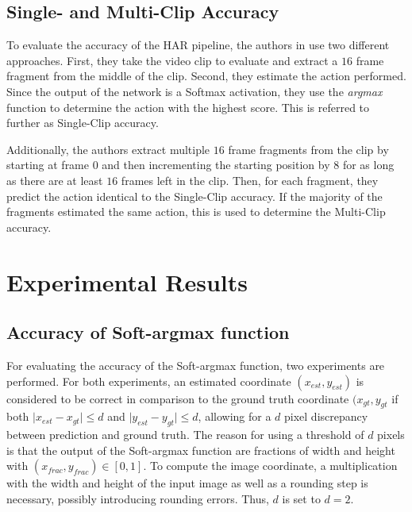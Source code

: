 \subsection{Single- and Multi-Clip Accuracy}
To evaluate the accuracy of the HAR pipeline, the authors in \cite{luvizon_2d/3d_2018} use two different approaches.
First, they take the video clip to evaluate and extract a $16$ frame fragment from the middle of the clip.
Second, they estimate the action performed.
Since the output of the network is a Softmax activation, they use the \textit{argmax} function to determine the action with the highest score.
This is referred to further as Single-Clip accuracy.

Additionally, the authors extract multiple $16$ frame fragments from the clip by starting at frame $0$ and then incrementing the starting position by $8$ for as long as there are at least $16$ frames left in the clip.
Then, for each fragment, they predict the action identical to the Single-Clip accuracy.
If the majority of the fragments estimated the same action, this is used to determine the Multi-Clip accuracy. 

\section{Experimental Results}

\label{sec:exp-results}
\subsection{Accuracy of Soft-argmax function}
For evaluating the accuracy of the Soft-argmax function, two experiments are performed.
For both experiments, an estimated coordinate $(x_{est},y_{est})$ is considered to be correct in comparison to the ground truth coordinate $(x_{gt}, y_{gt}$ if both $\lvert x_{est} - x_{gt} \rvert \leq d$ and $\lvert y_{est} - y_{gt} \rvert \leq d$, allowing for a $d$ pixel discrepancy between prediction and ground truth.
The reason for using a threshold of $d$ pixels is that the output of the Soft-argmax function are fractions of width and height with $(x_{frac}, y_{frac}) \in [0,1]$.
To compute the image coordinate, a multiplication with the width and height of the input image as well as a rounding step is necessary, possibly introducing rounding errors.
Thus, $d$ is set to $d=2$.

